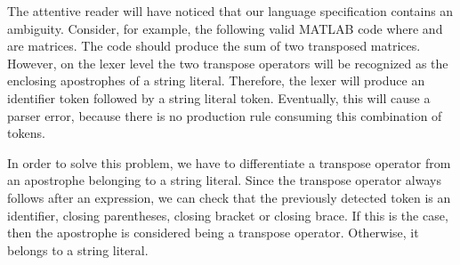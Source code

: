 The attentive reader will have noticed that our language specification contains an ambiguity.
Consider, for example, the following valid MATLAB code  where  and  are matrices.
The code should produce the sum of two transposed matrices.
However, on the lexer level the two transpose operators will be recognized as the enclosing apostrophes of a string literal.
Therefore, the lexer will produce an identifier token followed by a string literal token.
Eventually, this will cause a parser error, because there is no production rule consuming this combination of tokens.

In order to solve this problem, we have to differentiate a transpose operator from an apostrophe belonging to a string literal.
Since the transpose operator always follows after an expression, we can check that the previously detected token is an identifier, closing parentheses, closing bracket or closing brace.
If this is the case, then the apostrophe is considered being a transpose operator.
Otherwise, it belongs to a string literal.